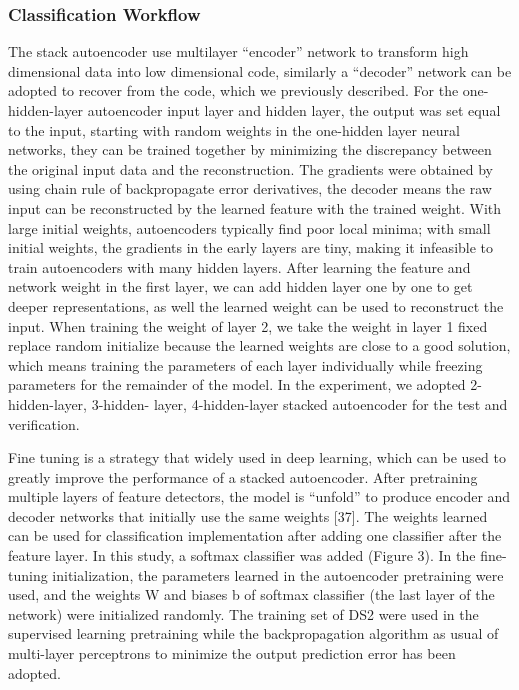 \documentclass[graybox]{svmult}
\begin{document}
\subsubsection{Classification Workflow}
The stack autoencoder use multilayer “encoder” network to transform high dimensional data into low dimensional code, similarly a “decoder” network can be adopted to recover from the code, which we previously described. For the one-hidden-layer autoencoder input layer and hidden layer, the output was set equal to the input, starting with random weights in the one-hidden layer neural networks, they can be trained together by minimizing the discrepancy between the original input data and the reconstruction. The gradients were obtained by using chain rule of backpropagate error derivatives, the decoder means the raw input can be reconstructed by the learned feature with the trained weight. With large initial weights, autoencoders typically find poor local minima; with small initial weights, the gradients in the early layers are tiny, making it infeasible to train autoencoders with many hidden layers. After learning the feature and network weight in the first layer, we can add hidden layer one by one to get deeper representations, as well the learned weight can be used to reconstruct the input. When training the weight of layer 2, we take the weight in layer 1 fixed replace random initialize because the learned weights are close to a good solution, which means training the parameters of each layer individually while freezing parameters for the remainder of the model. In the experiment, we adopted 2-hidden-layer, 3-hidden- layer, 4-hidden-layer stacked autoencoder for the test and verification.

Fine tuning is a strategy that widely used in deep learning, which can be used to greatly improve the performance of a stacked autoencoder. After pretraining multiple layers of feature detectors, the model is “unfold” to produce encoder and decoder networks that initially use the same weights [37]. The weights learned can be used for classification implementation after adding one classifier after the feature layer. In this study, a softmax classifier was added (Figure 3). In the fine-tuning initialization, the parameters learned in the autoencoder pretraining were used, and the weights W and biases b of softmax classifier (the last layer of the network) were initialized randomly. The training set of DS2 were used in the supervised learning pretraining while the backpropagation algorithm as usual of multi-layer perceptrons to minimize the output prediction error has been adopted.
\end{document}
